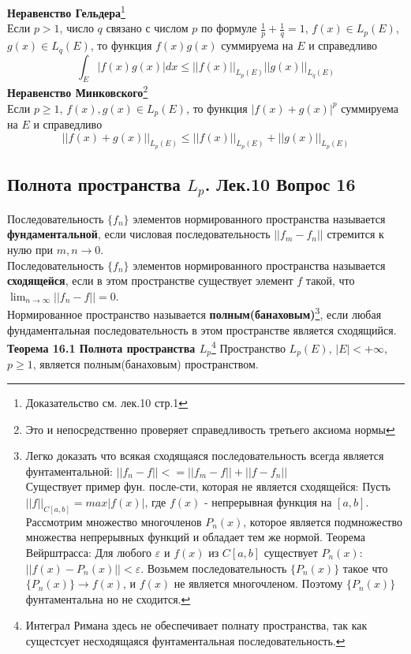\documentclass{article}
\begin{document}
	\textbf{Неравенство Гельдера}\footnote{Доказательство см. лек.10 стр.1}\\
	Если $p>1$, число $q$ связано с числом $p$ по формуле $\frac{1}{p}+\frac{1}{q}=1$, $f(x)\in {L}_{p}(E)$, $g(x)\in {L}_{q}(E)$, то функция $f(x)g(x)$ суммируема на $E$ и справедливо
	\begin{equation}
	\int_{E} |f(x)g(x)|dx\le {||f(x)||}_{{L}_{p}(E)} {||g(x)||}_{{L}_{q}(E)}
	\end{equation}
	\textbf{Неравенство Минковского}\footnote{Это и непосредственно проверяет справедливость третьего аксиома нормы}\\
	Если $p\ge 1$, $f(x),g(x)\in {L}_{p}(E)$, то функция ${|f(x)+g(x)|}^{p}$ суммируема на $E$ и справедливо
	\begin{equation}
	{||f(x)+g(x)||}_{{L}_{p}(E)}\le {||f(x)||}_{{L}_{p}(E)}+{||g(x)||}_{{L}_{p}(E)}
	\end{equation}
\subsection{Полнота пространства ${L}_{p}$. Лек.10 \textbf{Вопрос 16}}
	Последовательность $\{{f}_{n}\}$ элементов нормированного пространства называется \textbf{фундаментальной}, если числовая последовательность $||{f}_{m}-{f}_{n}||$ стремится к нулю при $m,n\rightarrow 0$.\\ 
	Последовательность $\{{f}_{n}\}$ элементов нормированного пространства называется \textbf{сходящейся}, если в этом пространстве существует элемент $f$ такой, что $\lim_{n \rightarrow \infty} ||{f}_{n}-f||=0$.\\
	Нормированное пространство называется \textbf{полным(банаховым)}\footnote{Легко доказать что всякая сходящаяся последовательность всегда является фунтаментальной: $||{f}_{n}-f||<=||{f}_{m}-f||+||f-{f}_{n}||$\\
	Существует пример фун. после-сти, которая не является сходящейся:
	Пусть ${||f||}_{C[a,b]}=max|f(x)|$, где $f(x)$ - непрерывная функция на $[a,b]$.	Рассмотрим множество многочленов ${P}_{n}(x)$, которое является подмножество множества непрерывных функций и обладает тем же нормой. Теорема Вейрштрасса: Для любого $\varepsilon$ и $f(x)$ из $C[a,b]$ существует ${P}_{n}(x)$: $||f(x)-{P}_{n}(x)||<\varepsilon$. Возьмем последовательность $\{{P}_{n}(x)\}$ такое что $\{{P}_{n}(x)\}\rightarrow f(x)$, и $f(x)$ не является многочленом. Поэтому $\{{P}_{n}(x)\}$ фунтаментальна но не сходится.}, если
	любая фундаментальная последовательность в этом пространстве является сходящийся.\\
	\textbf{Теорема 16.1 Полнота пространства ${L}_{p}$}\footnote{Интеграл Римана здесь не обеспечивает полнату пространства, так как сущестсует несходящаяся фунтаментальная последовательность.} Пространство ${L}_{p}(E)$, $|E|<+\infty$, $p\ge 1$, является полным(банаховым)
	пространством.\\
	
\end{document}
